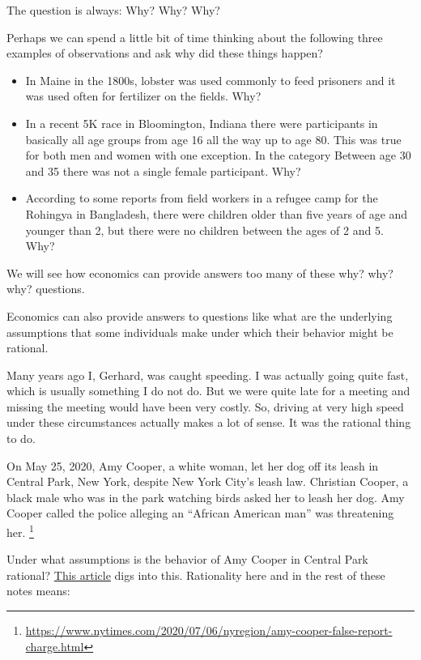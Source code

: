 \documentclass[
]{book}
\providecommand{\tightlist}{%
  \setlength{\itemsep}{0pt}\setlength{\parskip}{0pt}}
\begin{document}
The question is always:
Why? Why? Why?

Perhaps we can spend a little bit of time thinking about the following three examples of observations and ask why did these things happen?

\begin{itemize}
\tightlist
\item
  In Maine in the 1800s, lobster was used commonly to feed prisoners and it was used often for fertilizer on the fields. Why?\\
\item
  In a recent 5K race in Bloomington, Indiana there were participants in basically all age groups from age 16 all the way up to age 80. This was true for both men and women with one exception. In the category Between age 30 and 35 there was not a single female participant. Why?\\
\item
  According to some reports from field workers in a refugee camp for the Rohingya in Bangladesh, there were children older than five years of age and younger than 2, but there were no children between the ages of 2 and 5. Why?
\end{itemize}

We will see how economics can provide answers too many of these why? why? why? questions.

Economics can also provide answers to questions like what are the underlying assumptions that some individuals make under which their behavior might be rational.

Many years ago I, Gerhard, was caught speeding. I was actually going quite fast, which is usually something I do not do. But we were quite late for a meeting and missing the meeting would have been very costly. So, driving at very high speed under these circumstances actually makes a lot of sense. It was the rational thing to do.

On May 25, 2020, Amy Cooper, a white woman, let her dog off its leash in Central Park, New York, despite New York City's leash law. Christian Cooper, a black male who was in the park watching birds asked her to leash her dog. Amy Cooper called the police alleging an ``African American man'' was threatening her. \footnote{\url{https://www.nytimes.com/2020/07/06/nyregion/amy-cooper-false-report-charge.html}}

Under what assumptions is the behavior of Amy Cooper in Central Park rational? \href{https://www.ncronline.org/news/opinion/assumptions-white-privilege-and-what-we-can-do-about-it}{This article} digs into this. Rationality here and in the rest of these notes means:
\end{document}
